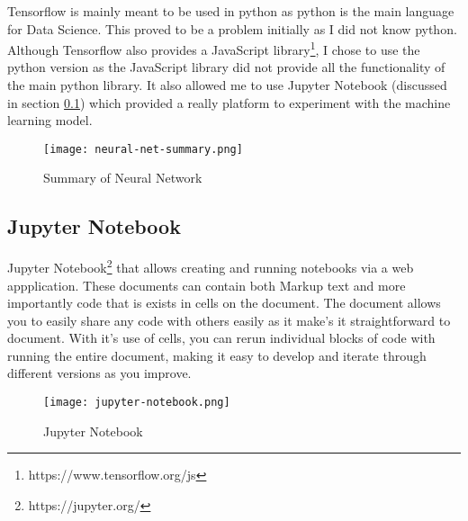 Tensorflow is mainly meant to be used in python as python is the main language for Data Science. This proved to be a problem initially as I did not know python. Although Tensorflow also provides a JavaScript library\footnote{https://www.tensorflow.org/js}, I chose to use the python version as the JavaScript library did not provide all the functionality of the main python library. It also allowed me to use Jupyter Notebook (discussed in section \ref{jupyterNotebook}) which provided a really platform to experiment with the machine learning model.

\begin{figure}[ht]
    \centering
    \texttt{[image: neural-net-summary.png]}
    \caption{Summary of Neural Network}
    \label{fig:neuralNetworkSummary}
\end{figure}

\subsection{Jupyter Notebook} \label{jupyterNotebook}
Jupyter Notebook\footnote{https://jupyter.org/} that allows creating and running notebooks via a web appplication. These documents can contain both Markup text and more importantly code that is exists in cells on the document. The document allows you to easily share any code with others easily as it make's it straightforward to document. With it's use of cells, you can rerun individual blocks of code with running the entire document, making it easy to develop and iterate through different versions as you improve.
\begin{figure}[ht]
    \centering
    \texttt{[image: jupyter-notebook.png]}
    \caption{Jupyter Notebook}
    \label{fig:JupyterNotebook}
\end{figure}

